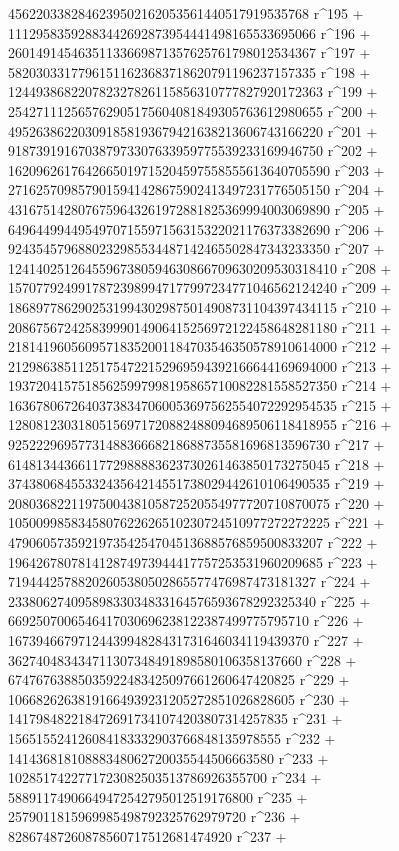        4562203382846239502162053561440517919535768 r^195 + 
       11129583592883442692873954441498165533695066 r^196 + 
       26014914546351133669871357625761798012534367 r^197 + 
       58203033177961511623683718620791196237157335 r^198 + 
       124493868220782327826115856310777827920172363 r^199 + 
       254271112565762905175604081849305763612980655 r^200 + 
       495263862203091858193679421638213606743166220 r^201 + 
       918739191670387973307633959775539233169946750 r^202 + 
       1620962617642665019715204597558555613640705590 r^203 + 
       2716257098579015941428675902413497231776505150 r^204 + 
       4316751428076759643261972881825369994003069890 r^205 + 
       6496449944954970715597156315322021176373382690 r^206 + 
       9243545796880232985534487142465502847343233350 r^207 + 
       12414025126455967380594630866709630209530318410 r^208 + 
       15707792499178723989947177997234771046562124240 r^209 + 
       18689778629025319943029875014908731104397434115 r^210 + 
       20867567242583999014906415256972122458648281180 r^211 + 
       21814196056095718352001184703546350578910614000 r^212 + 
       21298638511251754722152969594392166644169694000 r^213 + 
       19372041575185625997998195865710082281558527350 r^214 + 
       16367806726403738347060053697562554072292954535 r^215 + 
       12808123031805156971720882488094689506118418955 r^216 + 
       9252229695773148836668218688735581696813596730 r^217 + 
       6148134436611772988883623730261463850173275045 r^218 + 
       3743806845533243564214551738029442610106490535 r^219 + 
       2080368221197500438105872520554977720710870075 r^220 + 
       1050099858345807622626510230724510977272272225 r^221 + 
       479060573592197354254704513688576859500833207 r^222 + 
       196426780781412874973944417757253531960209685 r^223 + 
       71944425788202605380502865577476987473181327 r^224 + 
       23380627409589833034833164576593678292325340 r^225 + 
       6692507006546417030696238122387499775795710 r^226 + 
       1673946679712443994828431731646034119439370 r^227 + 
       362740483434711307348491898580106358137660 r^228 + 
       67476763885035922483425097661260647420825 r^229 + 
       10668262638191664939231205272851026828605 r^230 + 
       1417984822184726917341074203807314257835 r^231 + 
       156515524126084183332903766848135978555 r^232 + 
       14143681810888348062720035544506663580 r^233 + 
       1028517422771723082503513786926355700 r^234 + 
       58891174906649472542795012519176800 r^235 + 
       2579011815969985498792325762979720 r^236 + 
       82867487260878560717512681474920 r^237 + 
